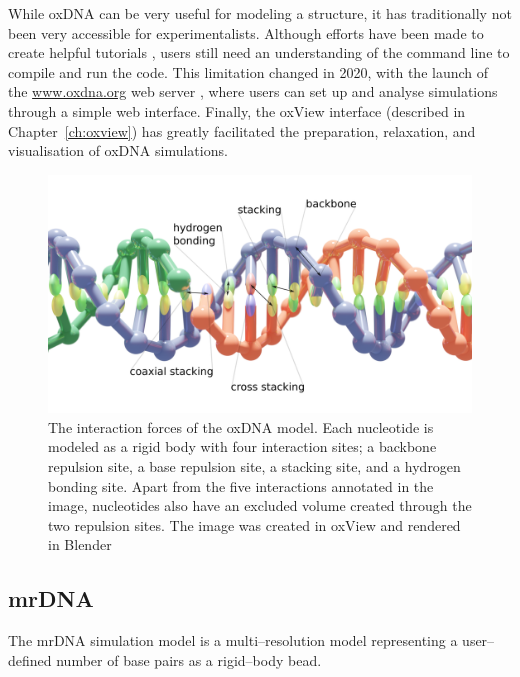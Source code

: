 

While oxDNA can be very useful for modeling a structure, it has traditionally not been very accessible for experimentalists. Although efforts have been made to create helpful tutorials \cite{doye2020oxdna}, users still need an understanding of the command line to compile and run the code. This limitation changed in 2020, with the launch of the \url{www.oxdna.org} web server \cite{oxdna.org}, where users can set up and analyse simulations through a simple web interface. Finally, the oxView interface \cite{poppleton2020design, bohlin2022oxview} (described in Chapter~\ref{ch:oxview}) has greatly facilitated the preparation, relaxation, and visualisation of oxDNA simulations. 

\begin{figure}[ht]
\begin{center}
    \includegraphics[width=\textwidth]{figures/oxdna_annot.png}
    \caption{The interaction forces of the oxDNA model. Each nucleotide is modeled as a rigid body with four interaction sites; a backbone repulsion site, a base repulsion site, a stacking site, and a hydrogen bonding site. Apart from the five interactions annotated in the image, nucleotides also have an excluded volume created through the two repulsion sites. The image was created in oxView and rendered in Blender}
    \label{fig_oxDNA}
    \end{center}
\end{figure}

\subsection{mrDNA}
\label{sec:mrdna}
The mrDNA simulation model \cite{maffeo2019mrdna} is a multi--resolution model representing a user--defined number of base pairs as a rigid--body bead.

